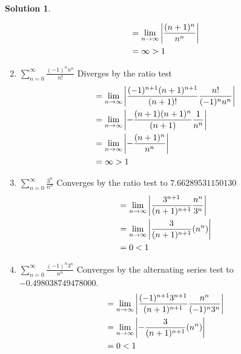 \documentclass[10pt]{article}
\theoremstyle{definition}
\newtheorem{soln}{Solution}
\begin{document}
\begin{soln}
\begin{enumerate}[label=(\alph*)]
\begin{align*}
                      & = \lim_{n \to \infty} \abs{\frac{(n+1)^n}{n^n}}                      \\
                      & = \infty>1                                                           \\
                \end{align*}
          \item $\displaystyle \sum_{n = 0}^{\infty} \frac{(-1)^nn^n}{n!}$ Diverges by the ratio test
                \begin{align*}
                      & = \lim_{n \to \infty} \abs{\frac{(-1)^{n+1}(n+1)^{n+1}}{(n+1)!}\frac{n!}{(-1)^nn^n}} \\
                      & = \lim_{n \to \infty} \abs{-\frac{(n+1)(n+1)^n}{(n+1)}\frac{1}{n^n}}                 \\
                      & = \lim_{n \to \infty} \abs{-\frac{(n+1)^n}{n^n}}                                     \\
                      & = \infty>1                                                                           \\
                \end{align*}
          \item $\displaystyle \sum_{n = 0}^{\infty} \frac{3^n}{n^n}$ Converges by the ratio test to $7.66289531150130$
                \begin{align*}
                      & = \lim_{n \to \infty} \abs{\frac{3^{n+1}}{(n+1)^{n+1}}\frac{n^n}{3^n}} \\
                      & = \lim_{n \to \infty} \abs{\frac{3}{(n+1)^{n+1}}(n^n)}                 \\
                      & = 0 < 1                                                                \\
                \end{align*}
          \item $\displaystyle \sum_{n = 0}^{\infty} \frac{(-1)^n3^n}{n^n}$ Converges by the alternating series test to $-0.498038749478000$.
                \begin{align*}
                      & = \lim_{n \to \infty} \abs{\frac{(-1)^{n+1}3^{n+1}}{(n+1)^{n+1}}\frac{n^n}{(-1)^n3^n}} \\
                      & = \lim_{n \to \infty} \abs{-\frac{3}{(n+1)^{n+1}}(n^n)}                                \\
                      & = 0 < 1                                                                                \\

\end{align*}
\end{enumerate}
\end{soln}
\end{document}
